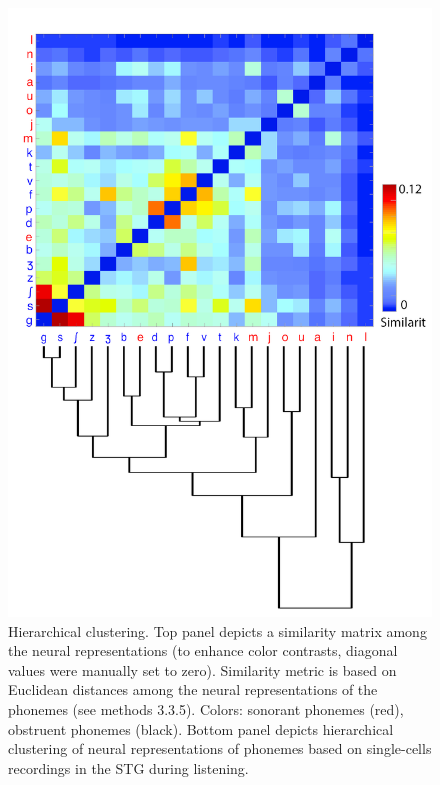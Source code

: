 \begin{figure}[h]
\vspace{.3in}
\includegraphics[width=\linewidth]{Figures/Ch3/Figure4_B.png}
\caption{Hierarchical clustering. Top panel depicts a similarity matrix among the neural representations (to enhance color contrasts, diagonal values were manually set to zero). Similarity metric is based on Euclidean distances among the neural representations of the phonemes (see methods 3.3.5). Colors: sonorant phonemes (red), obstruent phonemes (black). Bottom panel depicts hierarchical clustering of neural representations of phonemes based on single-cells recordings in the STG during listening.}
\end{figure}

